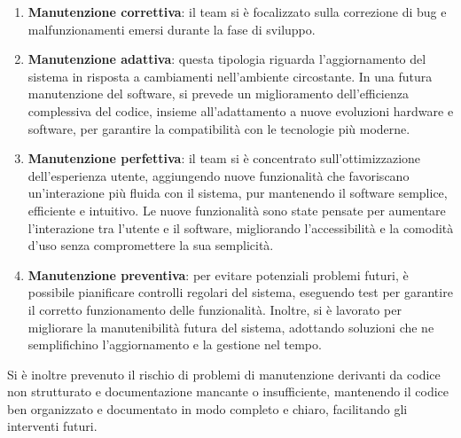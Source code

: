 \documentclass[a4paper,12pt]{article}
\begin{document}
\begin{enumerate}
    \item \textbf{Manutenzione correttiva}: il team si è focalizzato sulla correzione di bug e malfunzionamenti emersi durante la fase di sviluppo.

\item \textbf{Manutenzione adattiva}: questa tipologia riguarda l'aggiornamento del sistema in risposta a cambiamenti nell'ambiente circostante. In una futura manutenzione del software, si prevede un miglioramento dell'efficienza complessiva del codice, insieme all'adattamento a nuove evoluzioni hardware e software, per garantire la compatibilità con le tecnologie più moderne.

\item \textbf{Manutenzione perfettiva}: il team si è concentrato sull'ottimizzazione dell'esperienza utente, aggiungendo nuove funzionalità che favoriscano un'interazione più fluida con il sistema, pur mantenendo il software semplice, efficiente e intuitivo. Le nuove funzionalità sono state pensate per aumentare l'interazione tra l'utente e il software, migliorando l'accessibilità e la comodità d'uso senza compromettere la sua semplicità.

\item \textbf{Manutenzione preventiva}: per evitare potenziali problemi futuri, è possibile pianificare controlli regolari del sistema, eseguendo test per garantire il corretto funzionamento delle funzionalità. Inoltre, si è lavorato per migliorare la manutenibilità futura del sistema, adottando soluzioni che ne semplifichino l'aggiornamento e la gestione nel tempo. 
\end{enumerate}
Si è inoltre prevenuto il rischio di problemi di manutenzione derivanti da codice non strutturato e documentazione mancante o insufficiente, mantenendo il codice ben organizzato e documentato in modo completo e chiaro, facilitando gli interventi futuri.
\end{document}
